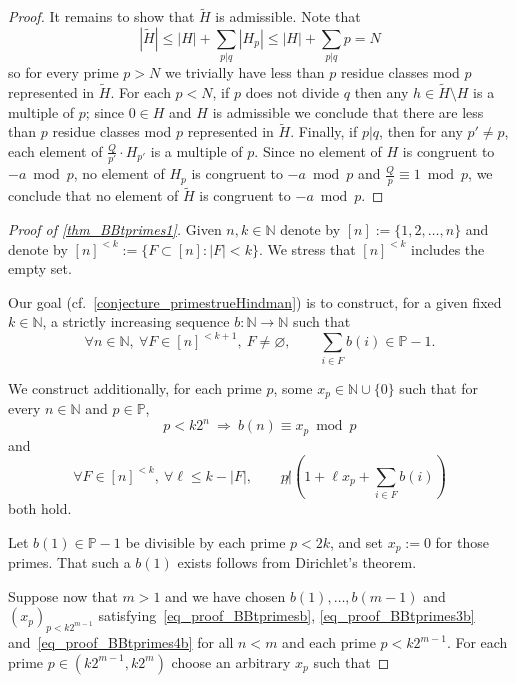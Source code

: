 \documentclass[10pt,dvipsnames]{article}
\theoremstyle{definition}
\theoremstyle{plain}
\renewcommand{\P}{\mathbb{P}}
\newcommand{\N}{\mathbb{N}}
\renewcommand{\emptyset}{\varnothing}
\begin{document}
\begin{appendices}
\begin{proof}
It remains to show that $\tilde H$ is admissible.
Note that
\[
|\tilde{H}| \le |H| + \sum_{p|q} |H_p| \le |H| + \sum_{p|q} p = N
\]
so for every prime $p>N$ we trivially have less than $p$ residue classes mod $p$ represented in $\tilde H$.
For each $p<N$, if $p$ does not divide $q$ then any $h\in\tilde H\setminus H$ is a multiple of $p$; since $0\in H$ and $H$ is admissible we conclude that there are less than $p$ residue classes mod $p$ represented in $\tilde H$.
Finally, if $p|q$, then for any $p'\neq p$, each element of $\tfrac Q{p'}\cdot H_{p'}$ is a multiple of $p$. Since no element of $H$ is congruent to $-a\bmod p$, no element of $H_p$ is congruent to $-a\bmod p$ and $\tfrac Qp\equiv1\bmod p$, we conclude that no element of $\tilde H$ is congruent to $-a\bmod p$.
\end{proof}


\begin{proof}[Proof of \cref{thm_BBtprimes1}]
Given $n,k\in\N$ denote by $[n]:=\{1,2,\dots,n\}$ and denote by $[n]^{<k}:=\{F\subset[n]:|F|<k\}$.
We stress that $[n]^{<k}$ includes the empty set.

Our goal (cf.\ \cref{conjecture_primestrueHindman}) is to construct, for a given fixed $k\in\N$, a strictly increasing sequence $b:\N\to\N$ such that
\begin{equation}\label{eq_proof_BBtprimesb}
    \forall n\in\N,\ \forall F\in[n]^{<k+1},\ F\neq\emptyset, \qquad \sum_{i\in F}b(i)\in\P-1.
\end{equation}

We construct additionally, for each prime $p$, some $x_p\in\N\cup\{0\}$ such that for every $n\in\N$ and $p\in\P$,
\begin{equation}\label{eq_proof_BBtprimes3b}
    p<k2^{n}\ \Rightarrow\ b(n)\equiv x_p\bmod p
\end{equation}
and
\begin{equation}\label{eq_proof_BBtprimes4b}
     \forall F\in[n]^{<k},\ \forall\ell\leq k-|F|,\qquad p\not|\left(1+\ell x_p+\sum_{i\in F}b(i)\right)
\end{equation}
both hold.

Let $b(1)\in\P-1$ be divisible by each prime $p< 2k$, and set $x_p:=0$ for those primes.
That such a $b(1)$ exists follows from Dirichlet's theorem.

Suppose now that $m>1$ and we have chosen $b(1),\dots,b(m-1)$ and $(x_p)_{p<k2^{m-1}}$  satisfying~\eqref{eq_proof_BBtprimesb}, \eqref{eq_proof_BBtprimes3b} and~\eqref{eq_proof_BBtprimes4b} for all $n<m$ and each prime $p<k2^{m-1}$.
For each prime $p\in(k2^{m-1},k2^{m})$ choose an arbitrary $x_p$ such that


\end{proof}
\end{appendices}
\end{document}
